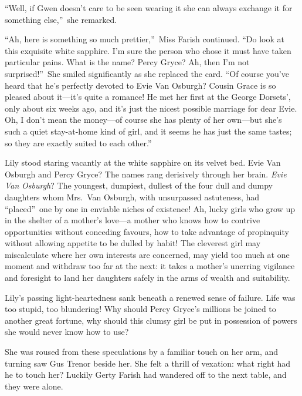 \documentclass[12pt,a4paper]{book}
\begin{document}
``Well, if Gwen doesn't care to be seen wearing it she can always
exchange it for something else,''\ she remarked.





``Ah, here is something so much prettier,''\ Miss Farish continued. 
``Do look at this exquisite white sapphire. I'm sure the person
who chose it must have taken particular pains. What is the name? 
Percy Gryce? Ah, then I'm not surprised!''\ She smiled
significantly as she replaced the card. ``Of course you've heard
that he's perfectly devoted to Evie Van Osburgh? Cousin Grace is
so pleased about it---it's quite a romance! He met her first at
the George Dorsets', only about six weeks ago, and it's just the
nicest possible marriage for dear Evie. Oh, I don't mean the
money---of course she has plenty of her own---but she's such a
quiet stay-at-home kind of girl, and it seems he has just the
same tastes; so they are exactly suited to each other.''





Lily stood staring vacantly at the white sapphire on its velvet
bed. Evie Van Osburgh and Percy Gryce? The names rang derisively
through her brain. \textit{Evie} \textit{Van} \textit{Osburgh}? The youngest, dumpiest,
dullest of the four dull and dumpy daughters whom Mrs.\ Van
Osburgh, with unsurpassed astuteness, had ``placed''\ one by one in
enviable niches of existence! Ah, lucky girls who grow up in the
shelter of a mother's love---a mother who knows how to contrive
opportunities without conceding favours, how to take advantage of
propinquity without allowing appetite to be dulled by habit! The
cleverest girl may miscalculate where her own interests are
concerned, may yield too much at one moment and withdraw too far
at the next: it takes a mother's unerring vigilance and foresight
to land her daughters safely in the arms of wealth and
suitability.





Lily's passing light-heartedness sank beneath a renewed sense of
failure. Life was too stupid, too blundering! Why should Percy
Gryce's millions be joined to another great fortune, why should
this clumsy girl be put in possession of powers she would never
know how to use?





She was roused from these speculations by a familiar touch
on her arm, and turning saw Gus Trenor beside her. She felt a
thrill of vexation: what right had he to touch her? Luckily Gerty
Farish had wandered off to the next table, and they were alone.
\end{document}
